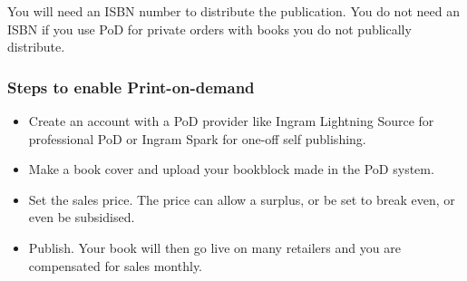 \documentclass{article}
\begin{document}
You will need an ISBN number to distribute the publication. You do not need an ISBN if you use PoD for private orders with books you do not publically distribute.


\subsubsection{Steps to enable Print-on-demand}\label{H855085}


\begin{itemize}
\item Create an account with a PoD provider like Ingram Lightning Source for professional PoD or Ingram Spark for one-off self publishing.


\item Make a book cover and upload your bookblock made in the PoD system.


\item Set the sales price. The price can allow a surplus, or be set to break even, or even be subsidised. 


\item Publish. Your book will then go live on many retailers and you are compensated for sales monthly. 


\end{itemize}
\end{document}
